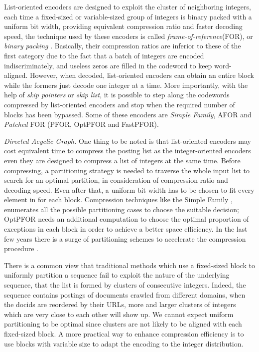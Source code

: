 \documentclass[runningheads,a4paper]{llncs}
\begin{document}
List-oriented encoders are designed to exploit the cluster of neighboring integers, each time a fixed-sized or variable-sized group of integers is binary packed with a uniform bit width, providing equivalent compression ratio and faster decoding speed, the technique used by these encoders is called \textit{frame-of-reference}(FOR), or \textit{binary packing} \cite{goldstein1998compressing}.
Basically, their compression ratios are inferior to these of the first category due to the fact that a batch of integers are encoded indiscriminately, and useless zeros are filled in the codeword to keep word-aligned.
However, when decoded, list-oriented encoders can obtain an entire block while the formers just decode one integer at a time.
More importantly, with the help of \textit{skip pointers} or \textit{skip list}, it is possible to step along the codewords compressed by list-oriented encoders and stop when the required number of blocks has been bypassed.
Some of these encoders are \textit{Simple Family}, AFOR and \textit{Patched} FOR (PFOR, OptPFOR and FastPFOR).

\textit{Directed Acyclic Graph.}
One thing to be noted is that list-oriented encoders may cost equivalent time to compress the posting list as the integer-oriented encoders even they are designed to compress a list of integers at the same time.
Before compressing, a partitioning strategy is needed to traverse the whole input list to search for an optimal partition, in consideration of compression ratio and decoding speed.
Even after that, a uniform bit width has to be chosen to fit every element in for each block.
Compression techniques like the Simple Family \cite{anh2005inverted,anh2010index}, enumerates all the possible partitioning cases to choose the suitable decision; OptPFOR \cite{yan2009inverted} needs an additional computation to choose the optimal proportion of exceptions in each block in order to achieve a better space efficiency.
In the last few years there is a surge of partitioning schemes to accelerate the compression procedure \cite{lemire2015decoding,ottaviano2014partitioned,zhao2015general}.

There is a common view that traditional methods which use a fixed-sized block to uniformly partition a sequence fail to exploit the nature of the underlying sequence, that the list is formed by clusters of consecutive integers.
Indeed, the sequence contains postings of documents crawled from different domains, when the docids are reordered by their URLs, more and larger clusters of integers which are very close to each other will show up.
We cannot expect uniform partitioning to be optimal since clusters are not likely to be aligned with each fixed-sized block.
A more practical way to enhance compression efficiency is to use blocks with variable size to adapt the encoding to the integer distribution.
\end{document}

